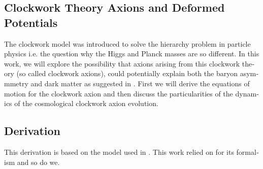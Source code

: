 \documentclass[master,       %
               twoside,        %
               BCOR10mm,       %
               english,ngerman, %
               ]{GAUBM}
\begin{document}
\begin{otherlanguage}{english}
\section{Clockwork Theory Axions and Deformed Potentials}
The clockwork model was introduced to solve the hierarchy problem in particle physics i.e. the question why the Higgs and Planck masses are so different. In this work, we will explore the possibility that axions arising from this clockwork theory (so called clockwork axions), could potentially explain both the baryon asymmmetry and dark matter as suggested in  \cite{Deformed_potential_Bae_2019}. First we will derive the equations of motion for the clockwork axion and then discuss the particularities of the dynamics of the cosmological clockwork axion evolution.

\subsection{Derivation}
This derivation is based on the model used in \cite{Deformed_potential_Bae_2019}. This work relied on \cite{general_cont_clockwork_Choi_2018} for its formalism and so do we.


\end{otherlanguage}
\end{document}

